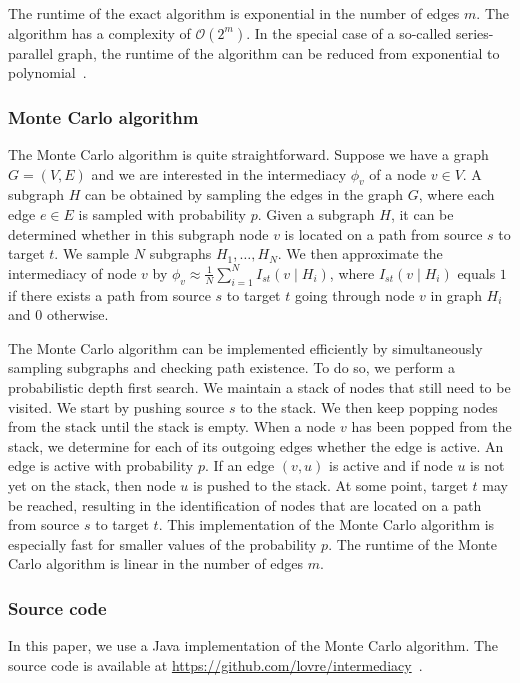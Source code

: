 \documentclass[9pt,twocolumn,twoside,lineno]{pnas-alt}
\theoremstyle{definition}
\renewcommand{\O}{\mathcal{O}}
\begin{document}
{The runtime of the exact algorithm is exponential in the number of edges $m$. The algorithm has a complexity of $\O(2^m)$. In the special case of a so-called series-parallel graph, the runtime of the algorithm can be reduced from exponential to polynomial~\cite{Misra1970}.

\subsubsection*{\label{sec:montecarlo}Monte Carlo algorithm}

The Monte Carlo algorithm is quite straightforward. Suppose we have a graph $G = (V, E)$ and we are interested in the intermediacy $\phi_v$ of a node $v \in V$. A subgraph $H$ can be obtained by sampling the edges in the graph $G$, where each edge $e \in E$ is sampled with probability $p$. Given a subgraph $H$, it can be determined whether in this subgraph node $v$ is located on a path from source $s$ to target $t$. We sample $N$ subgraphs $H_1, \ldots, H_N$. We then approximate the intermediacy of node $v$ by $\phi_v \approx \frac{1}{N}\sum_{i = 1}^N I_{st}(v \mid H_i)$, where $I_{st}(v \mid H_i)$ equals $1$ if there exists a path from source $s$ to target $t$ going through node $v$ in graph $H_i$ and $0$ otherwise.

The Monte Carlo algorithm can be implemented efficiently by simultaneously sampling subgraphs and checking path existence. To do so, we perform a probabilistic depth first search. We maintain a stack of nodes that still need to be visited. We start by pushing source $s$ to the stack. We then keep popping nodes from the stack until the stack is empty. When a node $v$ has been popped from the stack, we determine for each of its outgoing edges whether the edge is active. An edge is active with probability $p$. If an edge $(v, u)$ is active and if node $u$ is not yet on the stack, then node $u$ is pushed to the stack. At some point, target $t$ may be reached, resulting in the identification of nodes that are located on a path from source $s$ to target $t$. This implementation of the Monte Carlo algorithm is especially fast for smaller values of the probability $p$. The runtime of the Monte Carlo algorithm is linear in the number of edges $m$.

\subsubsection*{\label{sec:source}Source code}

In this paper, we use a Java implementation of the Monte Carlo algorithm. The source code is available at \url{https://github.com/lovre/intermediacy}~\cite{intermediacy}.

}

\showmatmethods{}


\showacknow{}

%
%


\end{document}
